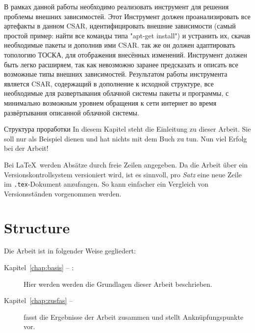 В рамках данной работы необходимо реализовать инструмент для решения проблемы внешних зависимостей. Этот Инструмент должен проанализировать все артефакты  в данном CSAR, идентифицировать внешние зависимости (самый простой пример: найти все команды типа "apt-get install") и устранить их, скачав необходимые пакеты и дополнив ими CSAR. так же он должен адаптировать топологию ТОСКА, для отображения внесённых изменений. Инструмент должен быть легко расширяем, так как невозможно заранее предсказать и описать все возможные типы внешних зависимостей. Результатом работы инструмента является CSAR, содержащий в дополнение к исходной структуре, все необходимые для развертывания облачной системы пакеты и программы, с минимально возможным уровнем обращения к сети интернет во время развёртывания описанной облачной системы. 
  
Структура проработки
\fi
In diesem Kapitel steht die Einleitung zu dieser Arbeit.
Sie soll nur als Beispiel dienen und hat nichts mit dem Buch \cite{WSPA} zu tun.
Nun viel Erfolg bei der Arbeit!

Bei \LaTeX\ werden Absätze durch freie Zeilen angegeben.
Da die Arbeit über ein Versionskontrollsystem versioniert wird, ist es sinnvoll, pro \emph{Satz} eine neue Zeile im \texttt{.tex}-Dokument anzufangen.
So kann einfacher ein Vergleich von Versionsständen vorgenommen werden.

\section*{Structure}
Die Arbeit ist in folgender Weise gegliedert:
\begin{description}
\item[Kapitel~\ref{chap:basis} -- :] Hier werden werden die Grundlagen dieser Arbeit beschrieben.
\item[Kapitel~\ref{chap:zusfas} -- ] fasst die Ergebnisse der Arbeit zusammen und stellt Anknüpfungspunkte vor.
\end{description}

